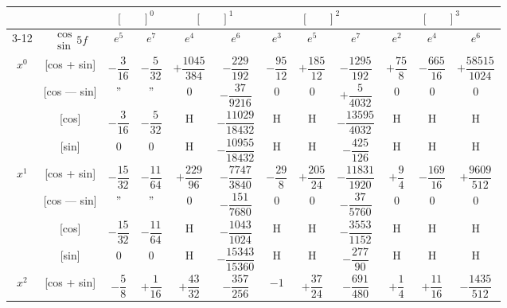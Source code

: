 \documentclass[11pt,a4paper]{book}
\begin{document}
\vspace{1em}

\newpage
{}

\begin{center}
\small
\begin{tabular}{|c|c|c|c|c|c|c|c|c|c|c|c|}
\hline
& & \multicolumn{2}{c|}{$[\phantom{()}]^0$} & \multicolumn{2}{c|}{$[\phantom{()}]^1$} & \multicolumn{3}{c|}{$[\phantom{()}]^2$} & \multicolumn{3}{c|}{$[\phantom{()}]^3$} \\
\cline{3-12}
& $\begin{smallmatrix} \cos \\ \sin \end{smallmatrix} 5f$ & $e^5$ & $e^7$ & $e^4$ & $e^6$ & $e^3$ & $e^5$ & $e^7$ & $e^2$ & $e^4$ & $e^6$ \\
\hline
\multirow{4}{*}{$x^0$} & [cos + sin] & $-\dfrac{3}{16}$ & $-\dfrac{5}{32}$ & $+\dfrac{1045}{384}$ & $-\dfrac{229}{192}$ & $-\dfrac{95}{12}$ & $+\dfrac{185}{12}$ & $-\dfrac{1295}{192}$ & $+\dfrac{75}{8}$ & $-\dfrac{665}{16}$ & $+\dfrac{58515}{1024}$ \\
& [cos --- sin] & $"$ & $"$ & $0$ & $-\dfrac{37}{9216}$ & $0$ & $0$ & $+\dfrac{5}{4032}$ & $0$ & $0$ & $0$ \\
& [cos] & $-\dfrac{3}{16}$ & $-\dfrac{5}{32}$ & H & $-\dfrac{11029}{18432}$ & H & H & $-\dfrac{13595}{4032}$ & H & H & H \\
& [sin] & $0$ & $0$ & H & $-\dfrac{10955}{18432}$ & H & H & $-\dfrac{425}{126}$ & H & H & H \\
\hline
\multirow{4}{*}{$x^1$} & [cos + sin] & $-\dfrac{15}{32}$ & $-\dfrac{11}{64}$ & $+\dfrac{229}{96}$ & $-\dfrac{7747}{3840}$ & $-\dfrac{29}{8}$ & $+\dfrac{205}{24}$ & $-\dfrac{11831}{1920}$ & $+\dfrac{9}{4}$ & $-\dfrac{169}{16}$ & $+\dfrac{9609}{512}$ \\
& [cos --- sin] & $"$ & $"$ & $0$ & $-\dfrac{151}{7680}$ & $0$ & $0$ & $-\dfrac{37}{5760}$ & $0$ & $0$ & $0$ \\
& [cos] & $-\dfrac{15}{32}$ & $-\dfrac{11}{64}$ & H & $-\dfrac{1043}{1024}$ & H & H & $-\dfrac{3553}{1152}$ & H & H & H \\
& [sin] & $0$ & $0$ & H & $-\dfrac{15343}{15360}$ & H & H & $-\dfrac{277}{90}$ & H & H & H \\
\hline
\multirow{4}{*}{$x^2$} & [cos + sin] & $-\dfrac{5}{8}$ & $+\dfrac{1}{16}$ & $+\dfrac{43}{32}$ & $-\dfrac{357}{256}$ & $-1$ & $+\dfrac{37}{24}$ & $-\dfrac{691}{480}$ & $+\dfrac{1}{4}$ & $+\dfrac{11}{16}$ & $-\dfrac{1435}{512}$ \\

\end{tabular}
\end{center}
\end{document}
